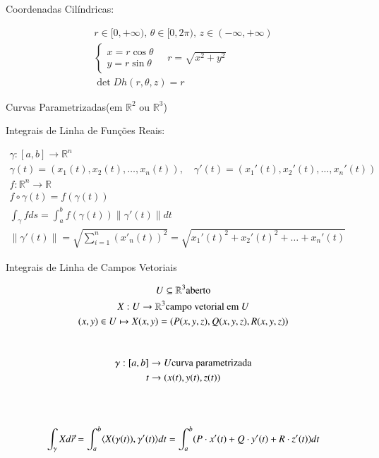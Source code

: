 	
	\begin{large}
	Coordenadas Cilíndricas:
	\end{large}
	\begin{gather*}
	r\in[0,+\infty), \,\theta\in[0,2\pi), 
	\, z\in(-\infty,+\infty)\\
	\begin{cases}
	x=r\cos\theta \\
	y=r\sin\theta	
	\end{cases}\hspace{12pt}
	r=\sqrt{x^2+y^2}\\
	\det Dh(r,\theta,z) = r
	\end{gather*}
	
	\newpage
	\begin{center}		
		\begin{Large}
			Curvas Parametrizadas(em $\mathbb{R}^2$ ou $\mathbb{R}^3$)
		\end{Large}
	\end{center}
	
	\begin{large}
	Integrais de Linha de Funções Reais:
	\end{large}
	\begin{gather*}
	\gamma:[a,b]\to\mathbb{R}^n \\
	\gamma(t)=(x_1(t),x_2(t),\ldots,x_n(t)), \hspace{12pt} \gamma'(t)=(x_1'(t),x_2'(t),\ldots,x_n'(t))\\
	f:\mathbb{R}^n\to\mathbb{R} \\
	f\circ \gamma (t) = f(\gamma (t))\\
	\displaystyle\int_\gamma f ds = \displaystyle\int_a^b f(\gamma (t))\|\gamma '(t)\| dt\\
	\|\gamma'(t)\|=\sqrt{\displaystyle\sum_{i=1}^n(x'_n(t))^2} = \sqrt{x_1'(t)^2+x_2'(t)^2+\ldots+x_n'(t)}
	\end{gather*}
	
	\begin{large}
	Integrais de Linha de Campos Vetoriais	
	\end{large}		
	\begin{gather*}
	U\subseteq\mathbb{R}^3 \text{aberto} \\
	X:U\to \mathbb{R}^3 \text{campo vetorial em $U$} \\
	(x,y)\in U \mapsto X(x,y)= (P(x,y,z),Q(x,y,z),R(x,y,z))\\
	\vspace{12pt}\\
	\gamma:[a,b] \to U \text{curva parametrizada}\\
	t \to (x(t),y(t),z(t)) \\
	\vspace{24pt}\\
	\displaystyle\int_\gamma Xd\vec{r}=\displaystyle\int_a^b\langle X(\gamma(t)), \gamma'(t) \rangle dt = \displaystyle\int_a^b(P\cdot x'(t) + Q\cdot y'(t) + R\cdot z'(t)) dt
	\end{gather*}
	
